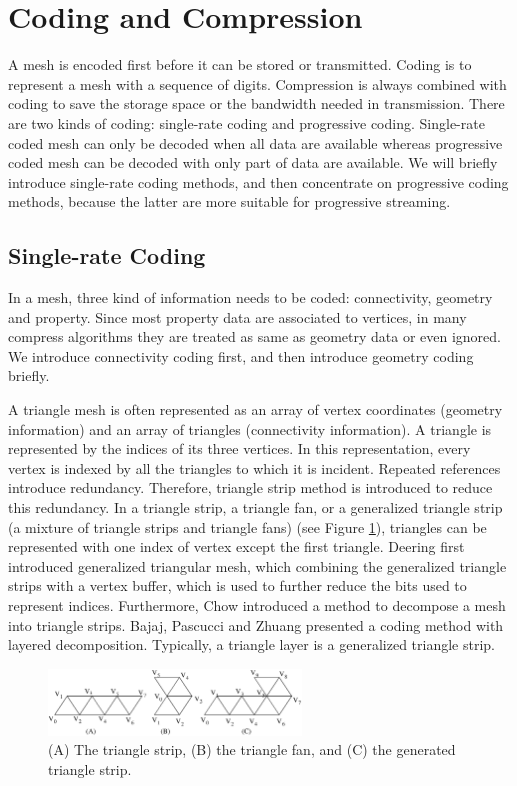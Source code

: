 \documentclass[11pt, a4paper]{report}
\begin{document}
    \section{Coding and Compression}
    A mesh is encoded first before it can be stored or
    transmitted. Coding is to represent a mesh with a sequence of
    digits. Compression is always combined with coding to save the storage space
    or the bandwidth needed in transmission. 
    There are two kinds of coding:
    single-rate coding and progressive coding. 
    Single-rate coded mesh can only be decoded when all data are available 
    whereas progressive coded mesh can be decoded with only part of data are available. 
    We will briefly introduce single-rate coding methods, and then concentrate on
    progressive coding methods, because the latter are more suitable for progressive streaming.
    
    \subsection{Single-rate Coding} \label{single_rate}
    In a mesh, three kind of information needs to be coded:
    connectivity, geometry and property. 
    Since most property data are associated to vertices, 
    in many compress algorithms they are treated as same as geometry data or even
    ignored. We introduce connectivity coding first, and then introduce geometry coding briefly.
    
    A triangle mesh is often represented as an array of vertex coordinates
    (geometry information) and an array of triangles (connectivity information). 
    A triangle is represented by the indices of its three vertices.
    In this representation, every vertex is indexed by all the
    triangles to which it is incident. Repeated references introduce
    redundancy. Therefore, triangle strip method is introduced to
    reduce this redundancy. In a triangle strip, a triangle fan, or a
    generalized triangle strip (a mixture of triangle strips and
    triangle fans) (see Figure \ref{strip}), 
    triangles can be represented with one index of vertex
    except the first triangle. 
    Deering \cite{218391} first introduced generalized triangular mesh, 
    which combining the generalized triangle strips with a vertex buffer,
    which is used to further reduce the bits used to represent indices. 
    Furthermore, Chow \cite{267103} introduced a method to
    decompose a mesh into triangle strips. 
    Bajaj, Pascucci and Zhuang \cite{789628} presented a coding method with layered
    decomposition. 
    Typically, a triangle layer is a generalized triangle strip. 
    \begin{figure}[ht]
    \centering
    \includegraphics[width=0.6\textwidth]{strip.eps}
    \caption{(A) The triangle strip, (B) the triangle fan, and (C) the generated triangle strip.}\label{strip}
    \end{figure}
\end{document}
